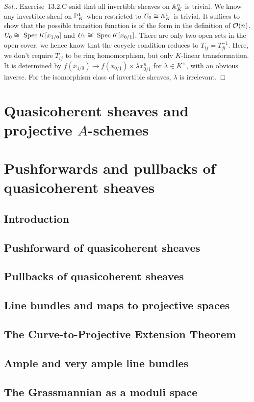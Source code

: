 \documentclass[11pt]{book} %
\begin{document}
\begin{proof}[Sol.]
Exercise~13.2.C said that all invertible sheaves on $\mathbb A^n_K$ is trivial. We know any invertible sheaf on $\mathbb P^1_K$ when restricted to $U_0\cong \mathbb A^1_K$ is trivial. It suffices to show that the possible transition function is of the form in the definition of ${\cal O}(n)$.
$U_0\cong \text{ Spec\,} K[x_{1/0}]$ and $U_1\cong\text{ Spec\,} K[x_{0/1}]$. There are only two open sets in the open cover, we hence know that the cocycle condition reduces to
$T_{ij}=T_{ji}^{-1}$. Here, we don't require $T_{ij}$ to be ring homomorphism, but only $K$-linear  transformation. It is determined by $f(x_{1/0})\mapsto f(x_{0/1})\times \lambda x_{0/1}^n$ for $\lambda \in K^\times$, with an obvious inverse. For the isomorphism class of invertible sheaves, $\lambda$ is irrelevant.
\end{proof}

\chapter{Quasicoherent sheaves and projective $A$-schemes}
\chapter{Pushforwards and pullbacks of quasicoherent sheaves}
\section{Introduction}
\section{Pushforward of quasicoherent sheaves}
\section{Pullbacks of quasicoherent sheaves}
\section{Line bundles and maps to projective spaces}
\section{The Curve-to-Projective Extension Theorem
}
\section{Ample and very ample line bundles}
\section{The Grassmannian as a moduli space}
\end{document}
